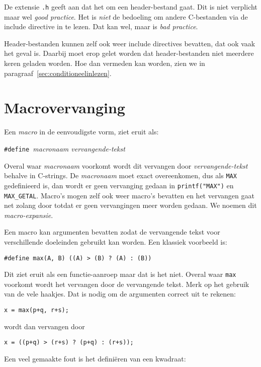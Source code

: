 De extensie \texttt{.h} geeft aan dat het om een header-bestand gaat. Dit is niet verplicht maar wel \textsl{good practice}. Het is \textsl{niet} de bedoeling om andere C-bestanden via de include directive in te lezen. Dat kan wel, maar is \textsl{bad practice}.

Header-bestanden kunnen zelf ook weer include directives bevatten, dat ook vaak het geval is. Daarbij moet erop gelet  worden dat header-bestanden niet meerdere keren geladen worden. Hoe dan vermeden kan worden, zien we in paragraaf~\ref{sec:conditioneelinlezen}.


\section{Macrovervanging}
Een \textsl{macro} in de eenvoudigste vorm, ziet eruit als:

\hspace*{1em}\texttt{\#define }\textsl{macronaam vervangende-tekst}

Overal waar \textsl{macronaam} voorkomt wordt dit vervangen door \textsl{vervangende-tekst} behalve in C-strings. De \textsl{macronaam} moet exact overeenkomen, dus als \texttt{MAX} gedefinieerd is, dan wordt er geen vervanging gedaan in \texttt{printf("{}MAX")} en \texttt{MAX\_GETAL}. Macro's mogen zelf ook weer macro's bevatten en het vervangen gaat net zolang door totdat er geen vervangingen meer worden gedaan. We noemen dit \textsl{macro-expansie}.

Een macro kan argumenten bevatten zodat de vervangende tekst voor verschillende doeleinden gebruikt kan worden. Een klassiek voorbeeld is:

\hspace*{1em}\texttt{\#define max(A, B) ((A) > (B) ? (A) : (B))}

Dit ziet eruit als een functie-aanroep maar dat is het niet. Overal waar \texttt{max} voorkomt wordt het vervangen door de vervangende tekst. Merk op het gebruik van de vele haakjes. Dat is nodig om de argumenten correct uit te rekenen:

\hspace*{1em}\texttt{x = max(p+q, r+s);}

wordt dan vervangen door

\hspace*{1em}\texttt{x = ((p+q) > (r+s) ? (p+q) : (r+s));}

Een veel gemaakte fout is het definiëren van een kwadraat:

